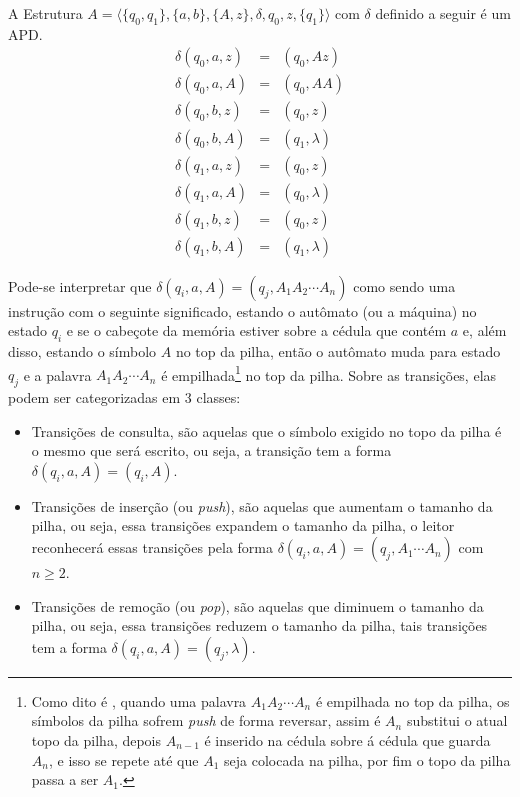 \begin{example}
    A Estrutura $A = \langle \{q_0, q_1\}, \{a, b\}, \{A, z\}, \delta, q_0, z, \{q_1\} \rangle$ com $\delta$ definido a seguir é um APD.
    \begin{eqnarray*}
        \delta(q_0, a, z) & = & (q_0, Az)\\
        \delta(q_0, a, A) & = & (q_0, AA)\\
        \delta(q_0, b, z) & = & (q_0, z)\\
        \delta(q_0, b, A) & = & (q_1, \lambda)\\
        \delta(q_1, a, z) & = & (q_0, z)\\
        \delta(q_1, a, A) & = & (q_0, \lambda)\\
        \delta(q_1, b, z) & = & (q_0, z)\\
        \delta(q_1, b, A) & = & (q_1, \lambda)
    \end{eqnarray*}
\end{example}

Pode-se interpretar que $\delta(q_i, a, A) = (q_j, A_1A_2\cdots A_n)$ como sendo uma instrução com o seguinte significado, estando o autômato (ou a máquina) no estado $q_i$ e se o cabeçote da memória estiver sobre a cédula que contém $a$ e, além disso, estando o símbolo $A$ no top da pilha, então o autômato muda para estado $q_j$ e a palavra $A_1A_2\cdots A_n$ é empilhada\footnote{Como dito é \cite{benjaLivro2010}, quando uma palavra $A_1A_2\cdots A_n$ é empilhada no top da pilha, os símbolos da pilha sofrem \textit{push} de forma reversar, assim é $A_n$ substitui o atual topo da pilha,  depois $A_{n-1}$ é inserido na cédula sobre á cédula que guarda $A_n$, e isso se repete até que $A_1$ seja colocada na pilha, por fim o topo da pilha passa a ser $A_1$.} no top da pilha. Sobre as transições, elas podem ser categorizadas em 3 classes: 

\begin{itemize}
    \item Transições de consulta, são aquelas que o símbolo exigido no topo da pilha é o mesmo que será escrito, ou seja, a transição tem a forma $\delta(q_i, a, A) = (q_i, A)$.
    \item Transições de inserção (ou \textit{push}), são aquelas que aumentam o tamanho da pilha, ou seja, essa transições expandem o tamanho da pilha, o leitor reconhecerá essas transições pela forma $\delta(q_i, a, A) = (q_j, A_1\cdots A_n)$ com $n \geq 2$.
    \item  Transições de remoção (ou \textit{pop}), são aquelas que diminuem o tamanho da pilha, ou seja, essa transições reduzem o tamanho da pilha, tais transições tem a forma $\delta(q_i, a, A) = (q_j, \lambda)$.
\end{itemize}

